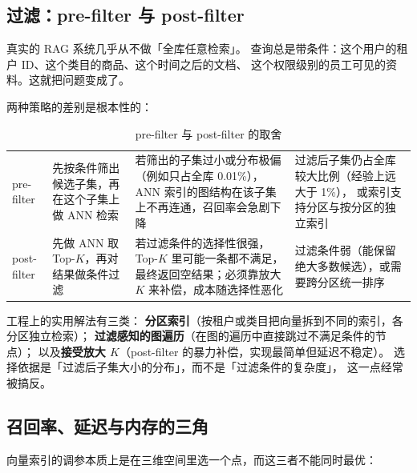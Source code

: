 \subsection{过滤：pre-filter 与 post-filter}

真实的 RAG 系统几乎从不做「全库任意检索」。
查询总是带条件：这个用户的租户 ID、这个类目的商品、这个时间之后的文档、
这个权限级别的员工可见的资料。这就把问题变成了。

两种策略的差别是根本性的：

\begin{table}[htbp]
\centering
\caption{pre-filter 与 post-filter 的取舍}
\label{tab:filter-strategies}
\small
\begin{tabularx}{\textwidth}{L{2.0cm} L{4.2cm} L{4.2cm} Y}
\toprule
{} &  &  &  \\
\midrule
pre-filter & 先按条件筛出候选子集，再在这个子集上做 ANN 检索 &
若筛出的子集过小或分布极偏（例如只占全库 0.01\%），
ANN 索引的图结构在该子集上不再连通，召回率会急剧下降 &
过滤后子集仍占全库较大比例（经验上远大于 1\%），
或索引支持分区与按分区的独立索引 \\
\addlinespace
post-filter & 先做 ANN 取 Top-$K$，再对结果做条件过滤 &
若过滤条件的选择性很强，Top-$K$ 里可能一条都不满足，
最终返回空结果；必须靠放大 $K$ 来补偿，成本随选择性恶化 &
过滤条件弱（能保留绝大多数候选），或需要跨分区统一排序 \\
\bottomrule
\end{tabularx}
\end{table}

工程上的实用解法有三类：
\textbf{分区索引}（按租户或类目把向量拆到不同的索引，各分区独立检索）；
\textbf{过滤感知的图遍历}（在图的遍历中直接跳过不满足条件的节点）；
以及\textbf{接受放大 $K$}（post-filter 的暴力补偿，实现最简单但延迟不稳定）。
选择依据是「过滤后子集大小的分布」，而不是「过滤条件的复杂度」，
这一点经常被搞反。

\subsection{召回率、延迟与内存的三角}

向量索引的调参本质上是在三维空间里选一个点，而这三者不能同时最优：

